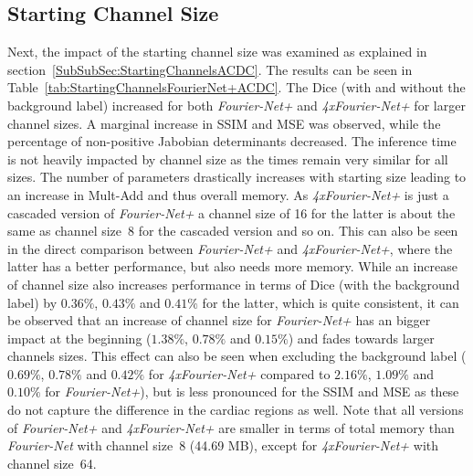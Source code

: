 \subsection{Starting Channel Size} \label{SubSec:ResultsStartingChannelsACDC}
Next, the impact of the starting channel size was examined as explained in section~\ref{SubSubSec:StartingChannelsACDC}. The results can be seen in Table~\ref{tab:StartingChannelsFourierNet+ACDC}. The Dice (with and without the background label) increased for both \emph{Fourier-Net+} and \emph{4xFourier-Net+} for larger channel sizes. A marginal increase in SSIM and MSE was observed, while the percentage of non-positive Jabobian determinants decreased. The inference time is not heavily impacted by channel size as the times remain very similar for all sizes. The number of parameters drastically increases with starting size leading to an increase in Mult-Add and thus overall memory. As \emph{4xFourier-Net+} is just a cascaded version of \emph{Fourier-Net+} a channel size of 16 for the latter is about the same as channel size~8 for the cascaded version and so on. This can also be seen in the direct comparison between \emph{Fourier-Net+} and \emph{4xFourier-Net+}, where the latter has a better performance, but also needs more memory. While an increase of channel size also increases performance in terms of Dice (with the background label) by $0.36\%$, $0.43\%$ and $0.41\%$ for the latter, which is quite consistent, it can be observed that an increase of channel size for \emph{Fourier-Net+} has an bigger impact at the beginning ($1.38\%$, $0.78\%$ and $0.15\%$) and fades towards larger channels sizes. This effect can also be seen when excluding the background label ($0.69\%$, $0.78\%$ and $0.42\%$ for \emph{4xFourier-Net+} compared to $2.16\%$, $1.09\%$ and $0.10\%$ for \emph{Fourier-Net+}), but is less pronounced for the SSIM and MSE as these do not capture the difference in the cardiac regions as well. Note that all versions of \emph{Fourier-Net+} and \emph{4xFourier-Net+} are smaller in terms of total memory than \emph{Fourier-Net} with channel size~8 (44.69 MB), except for \emph{4xFourier-Net+} with channel size~64.


